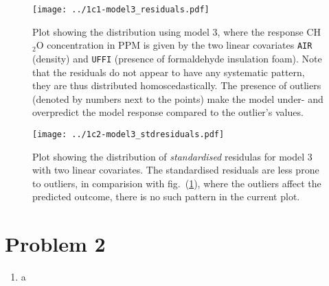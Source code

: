 \documentclass[a4paper,11pt]{article}
\begin{document}
\begin{enumerate}[label=\alph*)]
        \begin{figure}[htb]
            \centering
            \texttt{[image: ../1c1-model3\_residuals.pdf]}
            \caption{Plot showing the distribution using model 3, where the response CH$_2$O concentration in PPM is given by the two linear covariates \texttt{AIR} (density) and \texttt{UFFI} (presence of formaldehyde insulation foam). Note that the residuals do not appear to have any systematic pattern, they are thus distributed homoscedastically. The presence of outliers (denoted by numbers next to the points) make the model under- and overpredict the model response compared to the outlier's values. }
            \label{fig:1c-1}
        \end{figure}
        \begin{figure}[htb]
            \centering
            \texttt{[image: ../1c2-model3\_stdresiduals.pdf]}
            \caption{Plot showing the distribution of \textit{standardised} residulas for model 3 with two linear covariates. The standardised residuals are less prone to outliers, in comparision with fig.~(\ref{fig:1c-1}), where the outliers affect the predicted outcome, there is no such pattern in the current plot. }
            \label{fig:1c-2}
        \end{figure}
\end{enumerate}

\section*{Problem 2}
\begin{enumerate}[label=\alph*)]

    \item a
\end{enumerate}
\end{document}
